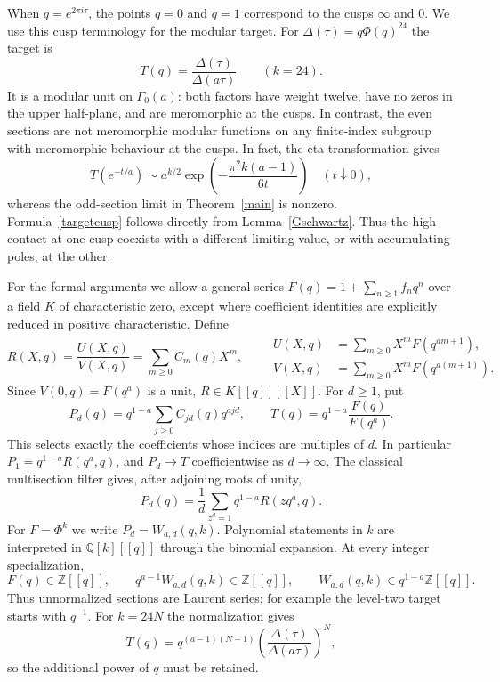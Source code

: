\documentclass[11pt]{amsart}
\theoremstyle{definition}
\theoremstyle{remark}
\numberwithin{equation}{section}
\newcommand{\Q}{\mathbb Q}\newcommand{\Z}{\mathbb Z}\newcommand{\C}{\mathbb C}
\begin{document}
When $q=e^{2\pi i\tau}$, the points $q=0$ and $q=1$ correspond to the cusps $\infty$ and $0$. We use this cusp terminology for the modular target. For $\Delta(\tau)=q\Phi(q)^{24}$ the target is
\begin{equation}\label{targetmod}
 T(q)=\frac{\Delta(\tau)}{\Delta(a\tau)}\qquad(k=24).
\end{equation}
It is a modular unit on $\Gamma_0(a)$: both factors have weight twelve, have no zeros in the upper half-plane, and are meromorphic at the cusps. In contrast, the even sections are not meromorphic modular functions on any finite-index subgroup with meromorphic behaviour at the cusps. In fact, the eta transformation gives
\begin{equation}\label{targetcusp}
 T(e^{-t/a})\sim a^{k/2}
       \exp\!\left(-\frac{\pi^2k(a-1)}{6t}\right)
       \quad(t\downarrow0),
\end{equation}
whereas the odd-section limit in Theorem~\ref{main} is nonzero. Formula~\eqref{targetcusp} follows directly from Lemma~\ref{Gschwartz}. Thus the high contact at one cusp coexists with a different limiting value, or with accumulating poles, at the other.

For the formal arguments we allow a general series $F(q)=1+\sum_{n\ge1}f_nq^n$ over a field $K$ of characteristic zero, except where coefficient identities are explicitly reduced in positive characteristic. Define
\begin{equation}\label{Rdef}
 R(X,q)=\frac{U(X,q)}{V(X,q)}=\sum_{m\ge0}C_m(q)X^m,
 \qquad
 \begin{aligned}
 U(X,q)&=\sum_{m\ge0}X^mF(q^{am+1}),\\
 V(X,q)&=\sum_{m\ge0}X^mF(q^{a(m+1)}).
 \end{aligned}
\end{equation}
Since $V(0,q)=F(q^a)$ is a unit, $R\in K[[q]][[X]]$. For $d\ge1$, put
\begin{equation}\label{Pdef}
 P_d(q)=q^{1-a}\sum_{j\ge0}C_{jd}(q)q^{ajd},
 \qquad T(q)=q^{1-a}\frac{F(q)}{F(q^a)}.
\end{equation}
This selects exactly the coefficients whose indices are multiples of $d$. In particular $P_1=q^{1-a}R(q^a,q)$, and $P_d\to T$ coefficientwise as $d\to\infty$. The classical multisection filter \cite[Chapter III]{Comtet} gives, after adjoining roots of unity,
\begin{equation}\label{rootfilter}
 P_d(q)=\frac1d\sum_{z^d=1}q^{1-a}R(zq^a,q).
\end{equation}
For $F=\Phi^k$ we write $P_d=W_{a,d}(q,k)$. Polynomial statements in $k$ are interpreted in $\Q[k][[q]]$ through the binomial expansion. At every integer specialization,
\[
 F(q)\in\Z[[q]],\qquad q^{a-1}W_{a,d}(q,k)\in\Z[[q]],\qquad
 W_{a,d}(q,k)\in q^{1-a}\Z[[q]].
\]
Thus unnormalized sections are Laurent series; for example the level-two target starts with $q^{-1}$. For $k=24N$ the normalization gives
\[
 T(q)=q^{(a-1)(N-1)}
 \left(\frac{\Delta(\tau)}{\Delta(a\tau)}\right)^N,
\]
so the additional power of $q$ must be retained.
\end{document}
